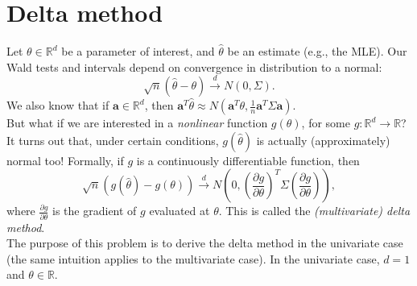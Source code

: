 \documentclass[11pt]{article}
\begin{document}
\section*{Delta method}


\noindent Let $\theta \in \mathbb{R}^d$ be a parameter of interest, and $\widehat{\theta}$ be an estimate (e.g., the MLE). Our Wald tests and intervals depend on convergence in distribution to a normal:
$$\sqrt{n}(\widehat{\theta} - \theta) \overset{d}{\to} N(0, \Sigma).$$
We also know that if $\bm{a} \in \mathbb{R}^d$, then $\bm{a}^T \widehat{\theta} \approx N(\bm{a}^T \theta, \frac{1}{n} \bm{a}^T \Sigma \bm{a})$.\\

\noindent But what if we are interested in a \textit{nonlinear} function $g(\theta)$, for some $g: \mathbb{R}^d \to \mathbb{R}$? It turns out that, under certain conditions, $g(\widehat{\theta})$ is actually (approximately) normal too! Formally, if $g$ is a continuously differentiable function, then
$$\sqrt{n}(g(\widehat{\theta}) - g(\theta)) \overset{d}{\to} N\left(0, \left( \frac{\partial g}{\partial \theta} \right)^T \Sigma \left( \frac{\partial g}{\partial \theta} \right) \right),$$
where $\frac{\partial g}{\partial \theta}$ is the gradient of $g$ evaluated at $\theta$. This is called the \textit{(multivariate) delta method}.\\

\noindent The purpose of this problem is to derive the delta method in the univariate case (the same intuition applies to the multivariate case). In the univariate case, $d = 1$ and $\theta \in \mathbb{R}$.
\end{document}
